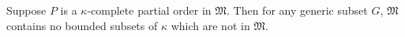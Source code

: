 \documentclass[12pt]{article}
\begin{document}
Suppose $P$ is a $\kappa$-complete partial order in $\mathfrak{M}$.  Then for any generic subset $G$, $\mathfrak{M}$ contains no bounded subsets of $\kappa$ which are not in $\mathfrak{M}$.
\end{document}
